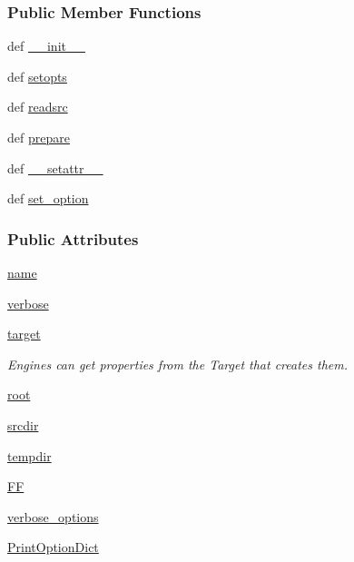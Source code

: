 \subsubsection*{Public Member Functions}
\begin{DoxyCompactItemize}
\item 
def \hyperlink{classforcebalance_1_1engine_1_1Engine_a907af5bf51d9ba4b010d6c2fa8cd85ff}{\-\_\-\-\_\-init\-\_\-\-\_\-}
\item 
def \hyperlink{classforcebalance_1_1engine_1_1Engine_ab018e2b35eeab6b4aeae7f53582e736d}{setopts}
\item 
def \hyperlink{classforcebalance_1_1engine_1_1Engine_a53eee9ed8dfd243a759ba6279d8dac7b}{readsrc}
\item 
def \hyperlink{classforcebalance_1_1engine_1_1Engine_a2eab57877002b41dc3742f0c67f2f24e}{prepare}
\item 
def \hyperlink{classforcebalance_1_1BaseClass_a0c851d413c3b2f30561b72a46771bcff}{\-\_\-\-\_\-setattr\-\_\-\-\_\-}
\item 
def \hyperlink{classforcebalance_1_1BaseClass_a73e9a37a7632e79eb99f49bd15aced45}{set\-\_\-option}
\end{DoxyCompactItemize}
\subsubsection*{Public Attributes}
\begin{DoxyCompactItemize}
\item 
\hyperlink{classforcebalance_1_1engine_1_1Engine_add3a4bf15527832034d88fb692a37115}{name}
\item 
\hyperlink{classforcebalance_1_1engine_1_1Engine_a29b97ebf8984e50fd19eb831715ab659}{verbose}
\item 
\hyperlink{classforcebalance_1_1engine_1_1Engine_a1fdd29fbd127cba331326a3557558e2a}{target}
\begin{DoxyCompactList}\small\item\em Engines can get properties from the Target that creates them. \end{DoxyCompactList}\item 
\hyperlink{classforcebalance_1_1engine_1_1Engine_a82e9382a3316d3e26ef29efb58db4a00}{root}
\item 
\hyperlink{classforcebalance_1_1engine_1_1Engine_ad9c499329de6299f0b8acf898d71e7d5}{srcdir}
\item 
\hyperlink{classforcebalance_1_1engine_1_1Engine_a7bb2deae7ee926f0df7758a92b382515}{tempdir}
\item 
\hyperlink{classforcebalance_1_1engine_1_1Engine_aeb55142568e89f7a92d745e04ec3c964}{F\-F}
\item 
\hyperlink{classforcebalance_1_1BaseClass_afd68efa29ccd2f320f4cf82198214aac}{verbose\-\_\-options}
\item 
\hyperlink{classforcebalance_1_1BaseClass_afc6659278497d7245bc492ecf405ccae}{Print\-Option\-Dict}
\end{DoxyCompactItemize}


